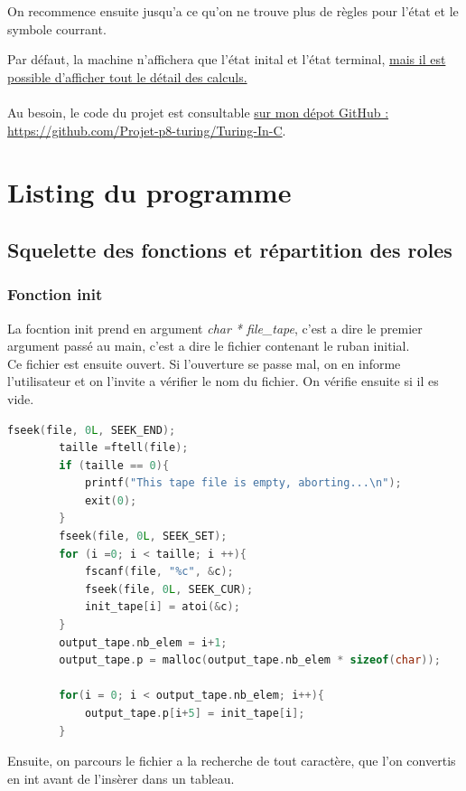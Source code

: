 \documentclass[12pt,a4paper]{report}
\begin{document}
\begin{itemize}
On recommence ensuite jusqu'a ce qu'on ne trouve plus de règles pour l'état et le symbole courrant.

Par défaut, la machine n'affichera que l'état inital et l'état terminal, \hyperref[chap:emploi]{mais il est possible d'afficher tout le détail des calculs.}\\\\
Au besoin, le code du projet est consultable \href{https://github.com/Projet-p8-turing/Turing-In-C}{sur mon dépot GitHub : https://github.com/Projet-p8-turing/Turing-In-C}.
\end{itemize}
\chapter{Listing du programme}
\section{Squelette des fonctions et répartition des roles}
\subsection{Fonction init}

La focntion init prend en argument \textit{char * file\_tape}, c'est a dire le premier argument passé au main, c'est a dire le fichier contenant le ruban initial.\\

Ce fichier est ensuite ouvert. Si l'ouverture se passe mal, on en informe l'utilisateur et on l'invite a vérifier le nom du fichier. On vérifie ensuite si il es vide.\\
\begin{lstlisting}[language=c]
        fseek(file, 0L, SEEK_END);
		taille =ftell(file);
		if (taille == 0){
			printf("This tape file is empty, aborting...\n");
			exit(0);
		}
		fseek(file, 0L, SEEK_SET);
		for (i =0; i < taille; i ++){
			fscanf(file, "%c", &c);
			fseek(file, 0L, SEEK_CUR);
			init_tape[i] = atoi(&c); 
		}	
		output_tape.nb_elem = i+1;
		output_tape.p = malloc(output_tape.nb_elem * sizeof(char));

		for(i = 0; i < output_tape.nb_elem; i++){
			output_tape.p[i+5] = init_tape[i];
		}
\end{lstlisting}
Ensuite, on parcours le fichier a la recherche de tout caractère, que l'on convertis en int avant de l'insèrer dans un tableau.\\
\end{document}
